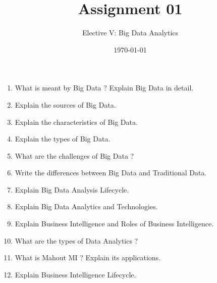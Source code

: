 \documentclass[12pt,a4paper]{article}
\title{Assignment 01}
\author{Elective V: Big Data Analytics}
\date{\today}
\begin{document}
\maketitle


\begin{enumerate}[label=\textbf{\arabic*.}, leftmargin=*]
    \item What is meant by Big Data ? Explain Big Data in detail.
    
    \item Explain the sources of Big Data.
    
    \item Explain the characteristics of Big Data.
    
    \item Explain the types of Big Data.
    
    \item What are the challenges of Big Data ?
    
    \item Write the differences between Big Data and Traditional Data.
    
    \item Explain Big Data Analysis Lifecycle.
    
    \item Explain Big Data Analytics and Technologies.
    
    \item Explain Business Intelligence and Roles of Business Intelligence.
    
    \item What are the types of Data Analytics ?
    
    \item What is Mahout MI ? Explain its applications.
    
    \item Explain Business Intelligence Lifecycle.
\end{enumerate}
\end{document}
